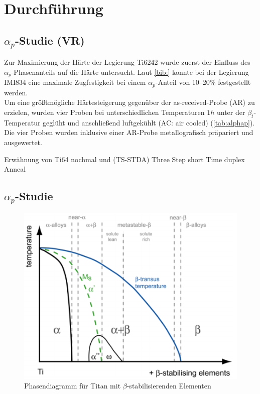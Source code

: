 \chapter{Durchführung}

\section{$\alpha_p$-Studie (VR)}
Zur Maximierung der Härte der Legierung Ti6242 wurde zuerst der Einfluss des $\alpha_p$-Phasenanteils auf die Härte untersucht. Laut \ref{bib:} konnte bei der Legierung IMI834 eine maximale Zugfestigkeit bei einem $\alpha_p$-Anteil von 10--20\% festgestellt werden. \\
Um eine größtmögliche Härtesteigerung gegenüber der as-received-Probe (AR) zu erzielen, wurden vier Proben bei unterschiedlichen Temperaturen $1h$ unter der $\beta_t$-Temperatur geglüht und anschließend luftgekühlt (AC: air cooled) (\ref{tab:alphap}). Die vier Proben wurden inklusive einer AR-Probe metallografisch präpariert und ausgewertet.

Erwähnung von Ti64 nochmal und (TS-STDA) Three Step short Time duplex Anneal
\section{$\alpha_p$-Studie}


\begin{figure}[h]
	\includegraphics{Bilder/Phasendiagramm_beta.png}
	\caption{Phasendiagramm für Titan mit $\beta$-stabilisierenden Elementen}
	\label{fig:phadia}
\end{figure}



